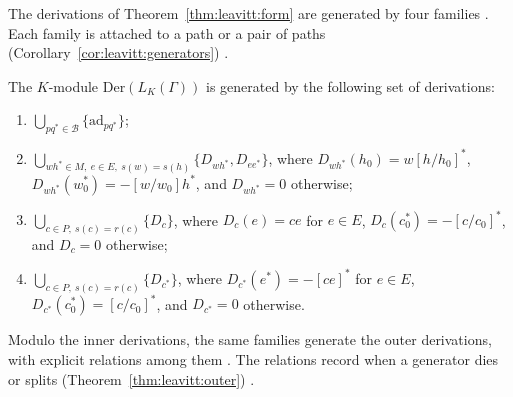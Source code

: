 The derivations of Theorem~\ref{thm:leavitt:form} are generated by four families
\cite[p.~64]{Lopatkin2019}. Each family is attached to a path or a pair of paths (Corollary~\ref{cor:leavitt:generators})
\cite[p.~64]{Lopatkin2019}.\begin{corollary}\label{cor:leavitt:generators}
The $K$-module $\mathrm{Der}(L_{K}(\Gamma))$ is generated by the following set of
derivations:
\begin{enumerate}[label=(\arabic*)]
\item $\bigcup_{pq^{*}\in\mathcal B}\{\mathrm{ad}_{pq^{*}}\}$;
\item $\bigcup_{wh^{*}\in M,\ e\in E,\ s(w)=s(h)}\{D_{wh^{*}},D_{ee^{*}}\}$, where
$D_{wh^{*}}(h_{0})=w[h/h_{0}]^{*}$, $D_{wh^{*}}(w_{0}^{*})=-[w/w_{0}]h^{*}$, and
$D_{wh^{*}}=0$ otherwise;
\item $\bigcup_{c\in P,\ s(c)=r(c)}\{D_{c}\}$, where $D_{c}(e)=ce$ for $e\in E$,
$D_{c}(c_{0}^{*})=-[c/c_{0}]^{*}$, and $D_{c}=0$ otherwise;
\item $\bigcup_{c\in P,\ s(c)=r(c)}\{D_{c^{*}}\}$, where $D_{c^{*}}(e^{*})=-[ce]^{*}$
for $e\in E$, $D_{c^{*}}(c_{0}^{*})=[c/c_{0}]^{*}$, and $D_{c^{*}}=0$ otherwise.
\end{enumerate}
\end{corollary}

Modulo the inner derivations, the same families generate the outer derivations, with
explicit relations among them \cite[p.~78]{Lopatkin2019}. The relations record when a
generator dies or splits (Theorem~\ref{thm:leavitt:outer}) \cite[p.~78]{Lopatkin2019}.

